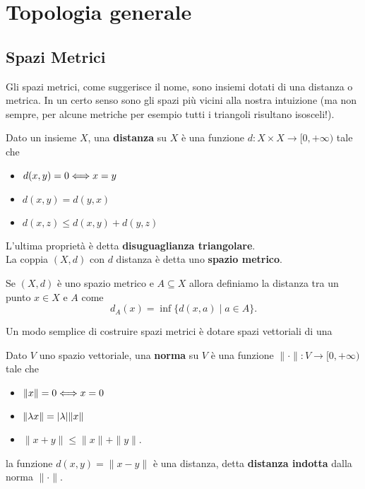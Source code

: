 \chapter{Topologia generale}
\setlength{\parindent}{2pt}

\begin{multicols*}{2}

\section{Spazi Metrici}
Gli spazi metrici, come suggerisce il nome, sono insiemi dotati di una distanza o metrica. In un certo senso sono gli spazi più vicini alla nostra intuizione (ma non sempre, per alcune metriche per esempio tutti i triangoli risultano isosceli!).
\begin{definition}
Dato un insieme $X$, una \textbf{distanza} su $X$ è una funzione $d:X\times X\to[0,+\infty)$ tale che
\begin{itemize}[noitemsep]
\item $d(x,y)=0\Longleftrightarrow x=y$
\item $d(x,y)=d(y,x)$
\item $d(x,z)\leq d(x,y)+d(y,z)$
\end{itemize}
L'ultima proprietà è detta \textbf{disuguaglianza triangolare}.\\
La coppia $(X,d)$ con $d$ distanza è detta uno \textbf{spazio metrico}.
\end{definition}

\begin{definition}
Se $(X,d)$ è uno spazio metrico e $A\subseteq X$ allora definiamo la distanza tra un punto $x\in X$ e $A$ come
\[d_A(x)=\inf\{d(x,a)\mid a\in A\}.\]
\end{definition}

Un modo semplice di costruire spazi metrici è dotare spazi vettoriali di una
\begin{definition}[Norma]
Dato $V$ uno spazio vettoriale, una \textbf{norma} su $V$ è una funzione $\|\cdot\|:V\to[0,+\infty)$ tale che
\begin{itemize}[noitemsep]
\item $\|x\|=0\Longleftrightarrow x=0$
\item $\|\lambda x\|=|\lambda|\|x\|$
\item $\|x+y\|\leq \|x\|+\|y\|$.
\end{itemize}
\end{definition}
\begin{remark}
la funzione $d(x,y)=\|x-y\|$ è una distanza, detta \textbf{distanza indotta} dalla norma $\|\cdot\|$.
\end{remark}
\vspace{0.5cm}


\end{multicols*}
